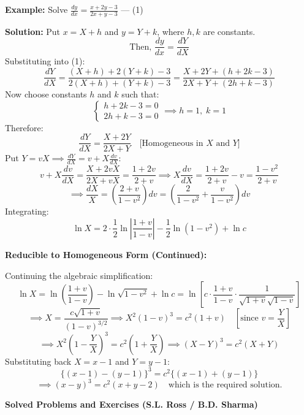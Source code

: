 \documentclass[11pt,a4paper]{article}
\newcommand{\Heading}[1]{\vspace{0.3cm}\noindent\textbf{\textcolor{AcademicGreen}{\large #1}}\par\vspace{0.15cm}}
\begin{document}
\vspace{0.2cm}
\begin{tcolorbox}[greenbox]
    \textbf{\textcolor{AcademicGreen}{Example:}} Solve $\frac{dy}{dx} = \frac{x + 2y - 3}{2x + y - 3}$ \quad --- (1)
    
    \vspace{0.15cm}
    \noindent\textbf{Solution:} Put $x = X + h$ and $y = Y + k$, where $h, k$ are constants.
    \[
    \text{Then, } \frac{dy}{dx} = \frac{dY}{dX}
    \]
    Substituting into (1):
    \[
    \frac{dY}{dX} = \frac{(X + h) + 2(Y + k) - 3}{2(X + h) + (Y + k) - 3} = \frac{X + 2Y + (h + 2k - 3)}{2X + Y + (2h + k - 3)}
    \]
    Now choose constants $h$ and $k$ such that:
    \[
    \begin{cases} 
    h + 2k - 3 = 0 \\ 
    2h + k - 3 = 0 
    \end{cases} \implies h = 1, \; k = 1
    \]
    Therefore:
    \[
    \frac{dY}{dX} = \frac{X + 2Y}{2X + Y} \quad \text{[Homogeneous in } X \text{ and } Y\text{]}
    \]
    Put $Y = vX \implies \frac{dY}{dX} = v + X\frac{dv}{dX}$:
    \[
    v + X\frac{dv}{dX} = \frac{X + 2vX}{2X + vX} = \frac{1 + 2v}{2 + v} \implies X\frac{dv}{dX} = \frac{1 + 2v}{2 + v} - v = \frac{1 - v^2}{2 + v}
    \]
    \[
    \implies \frac{dX}{X} = \left(\frac{2 + v}{1 - v^2}\right) dv = \left(\frac{2}{1 - v^2} + \frac{v}{1 - v^2}\right) dv
    \]
    Integrating:
    \[
    \ln X = 2 \cdot \frac{1}{2}\ln\left|\frac{1 + v}{1 - v}\right| - \frac{1}{2}\ln(1 - v^2) + \ln c
    \]
\end{tcolorbox}

\newpage

\Heading{Reducible to Homogeneous Form (Continued):}
Continuing the algebraic simplification:
\[
\ln X = \ln\left(\frac{1 + v}{1 - v}\right) - \ln\sqrt{1 - v^2} + \ln c = \ln\left[c \cdot \frac{1 + v}{1 - v} \cdot \frac{1}{\sqrt{1 + v}\sqrt{1 - v}}\right]
\]
\[
\implies X = \frac{c\sqrt{1 + v}}{(1 - v)^{3/2}} \implies X^2(1 - v)^3 = c^2(1 + v) \quad \left[\text{since } v = \frac{Y}{X}\right]
\]
\[
\implies X^2\left(1 - \frac{Y}{X}\right)^3 = c^2\left(1 + \frac{Y}{X}\right) \implies (X - Y)^3 = c^2(X + Y)
\]
Substituting back $X = x - 1$ and $Y = y - 1$:
\[
\{(x - 1) - (y - 1)\}^3 = c^2 \{(x - 1) + (y - 1)\}
\]
\[
\implies (x - y)^3 = c^2(x + y - 2) \quad \text{which is the required solution.}
\]

\vspace{0.4cm}
\begin{center}
    {\large\bfseries\textcolor{AcademicGreen}{Solved Problems and Exercises (S.L. Ross / B.D. Sharma)}}
\end{center}
\end{document}
